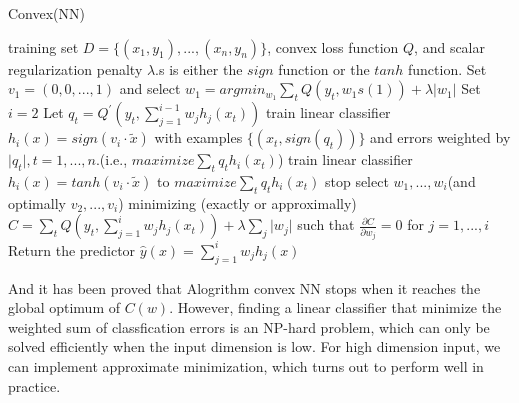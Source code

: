 \documentclass{article}
\begin{document}
\begin{algorithm}[htb]
	\caption{Convex(NN)}
	\label{algorithm:stepNN}
	\begin{algorithmic}[1]
		\REQUIRE
		training set $D = \{ (x_{1},y_{1}),...,(x_{n},y_{n})\}$, convex loss function $Q$, and scalar regularization penalty $\lambda$.s is either the $sign$ function or the $tanh$ function.
		\STATE Set $v_{1} = (0,0,...,1)$ and select $w_{1} = argmin_{w_{1}} \sum_{t} Q(y_{t},w_{1}s(1))+\lambda \lvert w_{1} \rvert$
		\STATE Set $i = 2$
		\STATE Let $q_{t} = Q^{'}(y_{t},\sum_{j=1}^{i-1} w_{j}h_{j}(x_t))$
		\STATE train linear classifier $h_{i}(x) = sign(v_{i}\cdot \tilde{x})$ with examples $\{(x_{t}, sign(q_{t}))\}$ and errors weighted by $\lvert q_{t} \rvert, t=1,...,n$.(i.e., $maximize \sum_{t} q_{t}h_{i}(x_{t})$)
		\STATE train linear classifier $h_{i}(x) = tanh(v_{i}\cdot \tilde{x})$ to $maximize \sum_{t} q_{t}h_{i}(x_{t})$
		\ENDIF
		\STATE stop
		\ENDIF
		\STATE select $w_{1},...,w_{i}$(and optimally $v_{2},...,v_{i}$) minimizing (exactly or approximally) $C = \sum_{t}Q(y_{t},\sum_{j=1}^{i} w_{j}h_{j}(x_{t})) + \lambda \sum_{j}\lvert w_{j} \rvert$ such that 
		$\frac{\partial C}{\partial w_{j}} = 0$ for $j=1,...,i$
		\STATE Return the predictor $\hat{y}(x) = \sum_{j=1}^{i} w_{j}h_{j}(x)$
		\ENDWHILE
	\end{algorithmic}
\end{algorithm}

And it has been proved that Alogrithm convex NN stops when it reaches the global optimum of $C(w)$. However, finding a linear classifier that minimize the weighted sum of classfication errors is an NP-hard problem, which can only be solved  efficiently when the input dimension is low. For high dimension input, we can implement approximate minimization, which turns out to perform well in practice.
\end{document}
